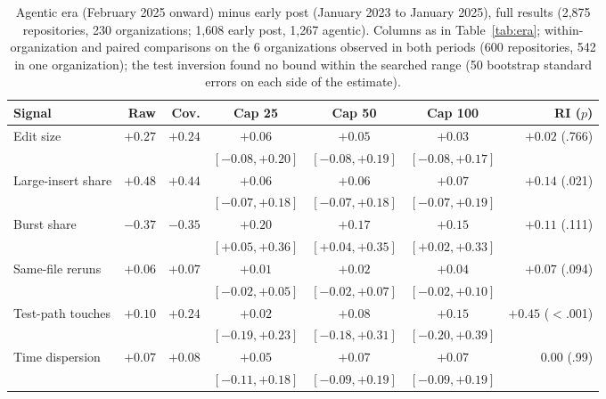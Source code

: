 \begin{table}[!htbp]
\caption{Agentic era (February 2025 onward) minus early post (January 2023 to January 2025), full results (2,875 repositories, 230 organizations; 1,608 early post, 1,267 agentic). Columns as in Table~\ref{tab:era}; within-organization and paired comparisons on the 6 organizations observed in both periods (600 repositories, 542 in one organization); the test inversion found no bound within the searched range (50 bootstrap standard errors on each side of the estimate).}
\label{tab:agent}
\scriptsize
\setlength{\tabcolsep}{2.5pt}
\begin{tabular}{@{}l r r c c c r@{}}
\toprule
Signal & Raw & Cov. & Cap 25 & Cap 50 & Cap 100 & RI ($p$) \\
\midrule
Edit size & $+0.27$ & $+0.24$ & $+0.06$ & $+0.05$ & $+0.03$ & $+0.02$ (.766) \\
 & & & $[-0.08, +0.20]$ & $[-0.08, +0.19]$ & $[-0.08, +0.17]$ & \\[2pt]
Large-insert share & $+0.48$ & $+0.44$ & $+0.06$ & $+0.06$ & $+0.07$ & $+0.14$ (.021) \\
 & & & $[-0.07, +0.18]$ & $[-0.07, +0.18]$ & $[-0.07, +0.19]$ & \\[2pt]
Burst share & $-0.37$ & $-0.35$ & $+0.20$ & $+0.17$ & $+0.15$ & $+0.11$ (.111) \\
 & & & $[+0.05, +0.36]$ & $[+0.04, +0.35]$ & $[+0.02, +0.33]$ & \\[2pt]
Same-file reruns & $+0.06$ & $+0.07$ & $+0.01$ & $+0.02$ & $+0.04$ & $+0.07$ (.094) \\
 & & & $[-0.02, +0.05]$ & $[-0.02, +0.07]$ & $[-0.02, +0.10]$ & \\[2pt]
Test-path touches & $+0.10$ & $+0.24$ & $+0.02$ & $+0.08$ & $+0.15$ & $+0.45$ ($<$.001) \\
 & & & $[-0.19, +0.23]$ & $[-0.18, +0.31]$ & $[-0.20, +0.39]$ & \\[2pt]
Time dispersion & $+0.07$ & $+0.08$ & $+0.05$ & $+0.07$ & $+0.07$ & $0.00$ (.99) \\
 & & & $[-0.11, +0.18]$ & $[-0.09, +0.19]$ & $[-0.09, +0.19]$ & \\[2pt]
\bottomrule
\end{tabular}

\medskip


\end{table}
